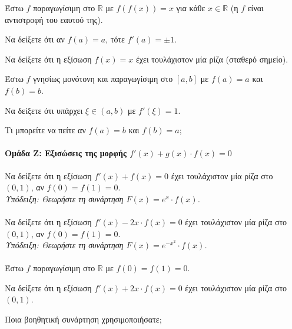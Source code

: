 \documentclass[11pt,a4paper,modern]{FFExercises}
\begin{document}
\askhsh
Έστω $f$ παραγωγίσιμη στο $\mathbb{R}$ με $f(f(x)) = x$ για κάθε $x \in \mathbb{R}$ (η $f$ είναι αντιστροφή του εαυτού της).
\begin{alist}
  \item Να δείξετε ότι αν $f(a) = a$, τότε $f'(a) = \pm 1$.
  \item Να δείξετε ότι η εξίσωση $f(x) = x$ έχει τουλάχιστον μία ρίζα (σταθερό σημείο).
\end{alist}

\askhsh
Έστω $f$ γνησίως μονότονη και παραγωγίσιμη στο $[a, b]$ με $f(a) = a$ και $f(b) = b$.
\begin{alist}
  \item Να δείξετε ότι υπάρχει $\xi \in (a, b)$ με $f'(\xi) = 1$.
  \item Τι μπορείτε να πείτε αν $f(a) = b$ και $f(b) = a$;
\end{alist}


\paragraph{Ομάδα Ζ: Εξισώσεις της μορφής $f'(x) + g(x) \cdot f(x) = 0$}

\askhsh
Να δείξετε ότι η εξίσωση $f'(x) + f(x) = 0$ έχει τουλάχιστον μία ρίζα στο $(0, 1)$, αν $f(0) = f(1) = 0$.\\
\textit{Υπόδειξη: Θεωρήστε τη συνάρτηση $F(x) = e^x \cdot f(x)$.}\\\\

\askhsh
Να δείξετε ότι η εξίσωση $f'(x) - 2x \cdot f(x) = 0$ έχει τουλάχιστον μία ρίζα στο $(0, 1)$, αν $f(0) = f(1) = 0$.\\
\textit{Υπόδειξη: Θεωρήστε τη συνάρτηση $F(x) = e^{-x^2} \cdot f(x)$.}\\\\

\askhsh
Έστω $f$ παραγωγίσιμη στο $\mathbb{R}$ με $f(0) = f(1) = 0$.
\begin{alist}
  \item Να δείξετε ότι η εξίσωση $f'(x) + 2x \cdot f(x) = 0$ έχει τουλάχιστον μία ρίζα στο $(0, 1)$.
  \item Ποια βοηθητική συνάρτηση χρησιμοποιήσατε;
\end{alist}
\end{document}
